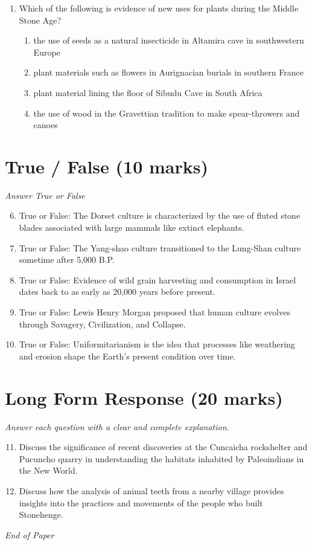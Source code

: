 \documentclass[12pt]{article}
\begin{document}
\begin{enumerate}[label=\arabic*.]
\begin{enumerate}[label=(\alph*)]
    \item Mit'a
    \item Split inheritance
    \item Capacocha
\end{enumerate}
\item Which of the following is evidence of new uses for plants during the Middle Stone Age?
\begin{enumerate}[label=(\alph*)]
    \item the use of seeds as a natural insecticide in Altamira cave in southwestern Europe
    \item plant materials such as flowers in Aurignacian burials in southern France
    \item plant material lining the floor of Sibudu Cave in South Africa
    \item the use of wood in the Gravettian tradition to make spear-throwers and canoes
\end{enumerate}
\end{enumerate}

\section*{True / False (10 marks)}
\textit{Answer True or False}
\begin{enumerate}[label=\arabic*.]
\setcounter{enumi}{5}
\item True or False: The Dorset culture is characterized by the use of fluted stone blades associated with large mammals like extinct elephants.
\item True or False: The Yang-shao culture transitioned to the Lung-Shan culture sometime after 5,000 B.P.
\item True or False: Evidence of wild grain harvesting and consumption in Israel dates back to as early as 20,000 years before present.
\item True or False: Lewis Henry Morgan proposed that human culture evolves through Savagery, Civilization, and Collapse.
\item True or False: Uniformitarianism is the idea that processes like weathering and erosion shape the Earth's present condition over time.
\end{enumerate}

\section*{Long Form Response (20 marks)}
\textit{Answer each question with a clear and complete explanation.}
\begin{enumerate}[label=\arabic*.]
\setcounter{enumi}{10}
\item Discuss the significance of recent discoveries at the Cuncaicha rockshelter and Pucuncho quarry in understanding the habitats inhabited by Paleoindians in the New World.
\item Discuss how the analysis of animal teeth from a nearby village provides insights into the practices and movements of the people who built Stonehenge.
\end{enumerate}

\vfill
\noindent\textit{End of Paper}
\end{document}
